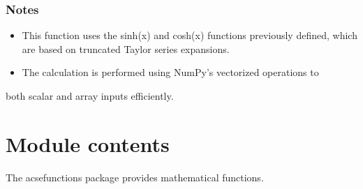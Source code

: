 \documentclass[a4paper,10pt,oneside,english]{sphinxmanual}
\begin{document}
\begin{fulllineitems}
\begin{sphinxVerbatim}[commandchars=\\\{\}]
\end{sphinxVerbatim}

\begin{sphinxVerbatim}[commandchars=\\\{\}]
\end{sphinxVerbatim}

\begin{sphinxVerbatim}[commandchars=\\\{\}]
\PYG{p}{[}  \PYG{p}{]}
\end{sphinxVerbatim}
\subsubsection*{Notes}
\begin{itemize}
\item {} 
\sphinxAtStartPar
This function uses the sinh(x) and cosh(x) functions previously defined,
which are based on truncated Taylor series expansions.

\item {} 
\sphinxAtStartPar
The calculation is performed using NumPy’s vectorized operations to

\end{itemize}
\begin{description}
\sphinxAtStartPar
both scalar and array inputs efficiently.

\end{description}

\end{fulllineitems}



\section{Module contents}
\label{\detokenize{acsefunctions:module-acsefunctions}}\label{\detokenize{acsefunctions:module-contents}}
\sphinxAtStartPar
The acsefunctions package provides mathematical functions.
\end{document}
